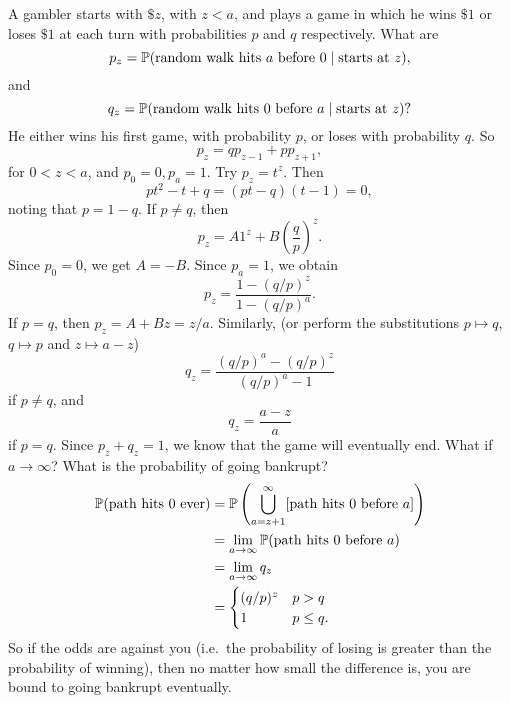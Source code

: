 \begin{note}
\begin{field}
    \begin{eg}
      A gambler starts with $\$z$, with $z < a$, and plays a game in which he wins $\$1$ or loses $\$ 1$ at each turn with probabilities $p$ and $q$ respectively. What are
      \[
        p_z = \P(\text{random walk hits $a$ before } 0 \mid \text{starts at } z),
      \]
      and
      \[
        q_z = \P(\text{random walk hits 0 before }a \mid \text{starts at }z)?
      \]
      He either wins his first game, with probability $p$, or loses with probability $q$. So
      \[
        p_z = qp_{z - 1} + pp_{z + 1},
      \]
      for $0 < z < a$, and $p_0 = 0, p_a = 1$.
      Try $p_z = t^z$. Then
      \[
        pt^2 - t + q = (pt - q)(t - 1) = 0,
      \]
      noting that $p = 1 - q$. If $p \not = q$, then
      \[
        p_z = A1^z + B\left(\frac{q}{p}\right)^z.
      \]
      Since $p_0 = 0$, we get $A = -B$. Since $p_a = 1$, we obtain
      \[
        p_z = \frac{1 - (q/p)^z}{1 - (q/p)^a}.
      \]
      If $p = q$, then $p_z = A + Bz = z/a$.
      Similarly, (or perform the substitutions $p\mapsto q$, $q\mapsto p$ and $z \mapsto a - z$)
      \[
        q_z = \frac{(q/p)^a - (q/p)^z}{(q / p)^a - 1}
      \]
      if $p\not = q$, and
      \[
        q_z = \frac{a - z}{a}
      \]
      if $p = q$. Since $p_z + q_z = 1$, we know that the game will eventually end.
      What if $a\to \infty$? What is the probability of going bankrupt?
      \begin{align*}
        \P(\text{path hits 0 ever}) &= \P\left(\bigcup_{a = z+1}^\infty [\text{path hits 0 before }a]\right)\\
        &= \lim_{a\to \infty}\P(\text{path hits 0 before }a)\\
        &= \lim_{a\to \infty}q_z\\
        &= \begin{cases}
          (q/p)^z & p > q\\
          1 & p \leq q.
        \end{cases}
      \end{align*}
      So if the odds are against you (i.e.\ the probability of losing is greater than the probability of winning), then no matter how small the difference is, you are bound to going bankrupt eventually.
    \end{eg}
  \end{field}
  \xplain{}%
\end{note}

